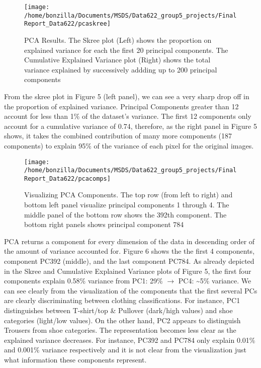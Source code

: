 \documentclass{article}
\begin{document}
\begin{figure}

{\centering \texttt{[image: /home/bonzilla/Documents/MSDS/Data622\_group5\_projects/FinalReport\_Data622/pcaskree]} 

}

\caption{PCA Results. The Skree plot (Left) shows the proportion on explained variance for each the first 20 principal components. The Cumulative Explained Variance plot (Right) shows the total variance explained by successively addding up to 200 principal components}\label{fig:unnamed-chunk-5}
\end{figure}

From the skree plot in Figure 5 (left panel), we can see a very sharp
drop off in the proportion of explained variance. Principal Components
greater than 12 account for less than 1\% of the dataset's variance. The
first 12 components only account for a cumulative variance of 0.74,
therefore, as the right panel in Figure 5 shows, it takes the combined
contribution of many more components (187 components) to explain 95\% of
the variance of each pixel for the original images.

\begin{figure}

{\centering \texttt{[image: /home/bonzilla/Documents/MSDS/Data622\_group5\_projects/FinalReport\_Data622/pcacomps]} 

}

\caption{Visualizing PCA Components. The top row (from left to right) and bottom left panel visualize principal components 1 through 4. The middle panel of the bottom row shows the 392th component. The bottom right panels shows principal component 784}\label{fig:unnamed-chunk-6}
\end{figure}

PCA returns a component for every dimension of the data in descending
order of the amount of variance accounted for. Figure 6 shows the the
first 4 components, component PC392 (middle), and the last component
PC784. As already depicted in the Skree and Cumulative Explained
Variance plots of Figure 5, the first four components explain 0.58\%
variance from PC1: 29\% \(\rightarrow\) PC4: \textasciitilde5\%
variance. We can see clearly from the visualization of the components
that the first several PCs are clearly discriminating between clothing
classifications. For instance, PC1 distinguishes between T-shirt/top \&
Pullover (dark/high values) and shoe categories (light/low values). On
the other hand, PC2 appears to distinguish Trousers from shoe
categories. The representation becomes less clear as the explained
variance decreases. For instance, PC392 and PC784 only explain 0.01\%
and 0.001\% variance respectively and it is not clear from the
visualization just what information these components represent.
\end{document}

